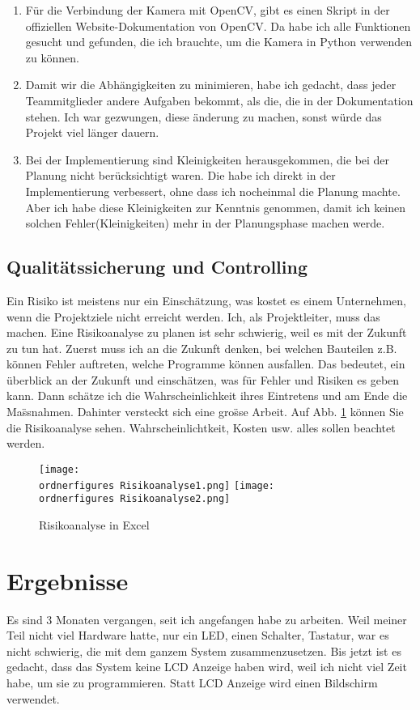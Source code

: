 \begin{itemize}
\begin{enumerate}
	\item  F\"ur die Verbindung der Kamera mit OpenCV, gibt es einen Skript in der offiziellen Website-Dokumentation von OpenCV. Da habe ich alle Funktionen gesucht und gefunden, die ich brauchte, um die Kamera in Python verwenden zu k\"onnen. 
	
	\item Damit wir die Abh\"angigkeiten zu minimieren, habe ich gedacht, dass jeder Teammitglieder andere Aufgaben bekommt, als die, die in der Dokumentation stehen. Ich war gezwungen, diese \"anderung zu machen, sonst w\"urde das Projekt viel l\"anger dauern. 
	
	\item Bei der Implementierung sind Kleinigkeiten herausgekommen, die bei der Planung nicht ber\"ucksichtigt waren. Die habe ich direkt in der Implementierung verbessert, ohne dass ich nocheinmal die Planung machte. Aber ich habe diese Kleinigkeiten zur Kenntnis genommen, damit ich keinen solchen Fehler(Kleinigkeiten) mehr in der Planungsphase machen werde. 
 \end{enumerate}
\end{itemize}
\subsection{Qualit\"atssicherung und Controlling}
Ein Risiko ist meistens nur ein Einsch\"atzung, was kostet es einem Unternehmen, wenn die Projektziele nicht erreicht werden. Ich, als Projektleiter, muss das machen. Eine Risikoanalyse zu planen ist sehr schwierig, weil es mit der Zukunft zu tun hat. Zuerst muss ich an die Zukunft denken, bei welchen Bauteilen z.B. k\"onnen Fehler auftreten, welche Programme k\"onnen ausfallen. Das bedeutet, ein \"uberblick an der Zukunft und einsch\"atzen, was f\"ur Fehler und Risiken es geben kann. Dann sch\"atze ich die Wahrscheinlichkeit ihres Eintretens und am Ende die Ma\"ssnahmen. Dahinter versteckt sich eine gro\"sse Arbeit.\cite{Risikoanalyse} 
Auf Abb. \ref{fig:Risikoanalyse} k\"onnen Sie die Risikoanalyse sehen. Wahrscheinlichtkeit, Kosten usw. alles sollen beachtet werden.
\begin{figure}[H]
	\texttt{[image: \\ordnerfigures Risikoanalyse1.png]}
	\texttt{[image: \\ordnerfigures Risikoanalyse2.png]}
	\caption{Risikoanalyse in Excel}
	\label{fig:Risikoanalyse}
\end{figure}

\section{Ergebnisse}
Es sind 3 Monaten vergangen, seit ich angefangen habe zu arbeiten. Weil meiner Teil nicht viel Hardware hatte, nur ein LED, einen Schalter, Tastatur, war es nicht schwierig, die mit dem ganzem System zusammenzusetzen. Bis jetzt ist es gedacht, dass das System keine LCD Anzeige haben wird, weil ich nicht viel Zeit habe, um sie zu programmieren. Statt LCD Anzeige wird einen Bildschirm verwendet. 
